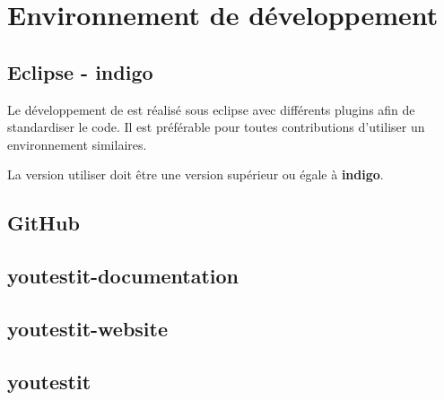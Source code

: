\newpage{}
\chapter{Environnement de développement}

\section{Eclipse - indigo}
Le développement de \youTestIt{} est réalisé sous eclipse avec différents plugins afin de standardiser 
le code. Il est préférable pour toutes contributions d'utiliser un environnement similaires.

La version utiliser doit être une version supérieur ou égale à \textbf{indigo}. 



\section{GitHub}


\section{youtestit-documentation}


\section{youtestit-website}	


\section{youtestit}

